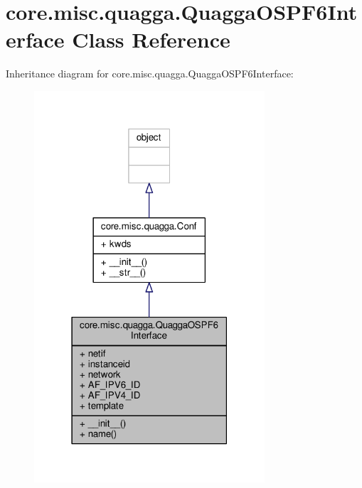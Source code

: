 \hypertarget{classcore_1_1misc_1_1quagga_1_1_quagga_o_s_p_f6_interface}{\section{core.\+misc.\+quagga.\+Quagga\+O\+S\+P\+F6\+Interface Class Reference}
\label{classcore_1_1misc_1_1quagga_1_1_quagga_o_s_p_f6_interface}
}


Inheritance diagram for core.\+misc.\+quagga.\+Quagga\+O\+S\+P\+F6\+Interface\+:
\nopagebreak
\begin{figure}[H]
\begin{center}
\leavevmode
\includegraphics[width=243pt]{classcore_1_1misc_1_1quagga_1_1_quagga_o_s_p_f6_interface__inherit__graph}
\end{center}
\end{figure}


